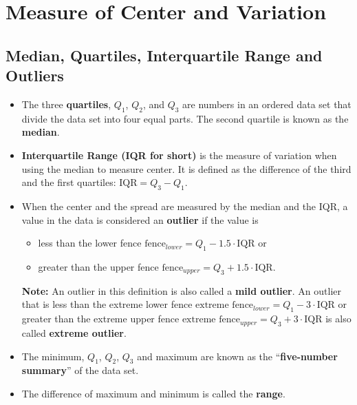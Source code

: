 
\section{Measure of Center and Variation}

\hypertarget{median-quartiles-interquartile-range-and-outliers}{%
\subsection{Median, Quartiles, Interquartile Range and
Outliers}\label{median-quartiles-interquartile-range-and-outliers}}

\begin{itemize}
\item
  The three \textbf{quartiles}, \(Q_1\), \(Q_2\), and \(Q_3\) are
  numbers in an ordered data set that divide the data set into four
  equal parts. The second quartile is known as the \textbf{median}.
\item
  \textbf{Interquartile Range (IQR for short)} is the measure of
  variation when using the median to measure center. It is defined as
  the difference of the third and the first quartiles:
  \(\text{IQR}=Q_3-Q_1\).
\item
  When the center and the spread are measured by the median and the IQR,
  a value in the data is considered an \textbf{outlier} if the value is

  \begin{itemize}
  \item
    less than the lower fence
    \(\text{fence}_{lower}=Q_1 - 1.5 \cdot \text{IQR}\) or
  \item
    greater than the upper fence
    \(\text{fence}_{upper}=Q_3 + 1.5 \cdot \text{IQR}\).
  \end{itemize}

  \textbf{Note:} An outlier in this definition is also called a
  \textbf{mild outlier}. An outlier that is less than the extreme lower
  fence \(\text{extreme fence}_{lower}=Q_1 - 3 \cdot \text{IQR}\) or
  greater than the extreme upper fence
  \(\text{extreme fence}_{upper}=Q_3 + 3 \cdot \text{IQR}\) is also
  called \textbf{extreme outlier}.
\item
  The minimum, \(Q_1\), \(Q_2\), \(Q_3\) and maximum are known as the
  ``\textbf{five-number summary}'' of the data set.
\item
  The difference of maximum and minimum is called the \textbf{range}.
\end{itemize}


